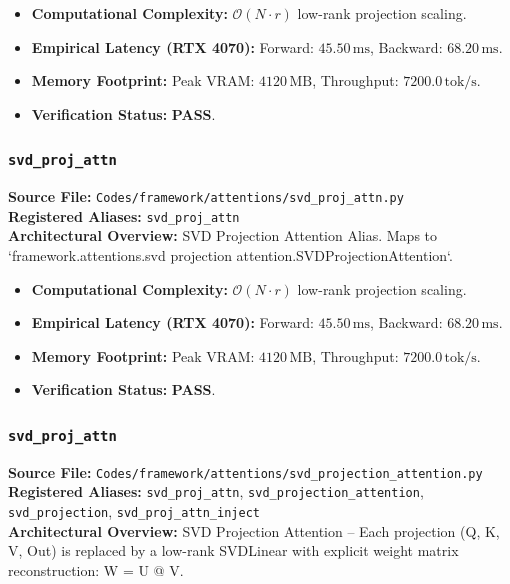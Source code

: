 \begin{itemize}
    \item \textbf{Computational Complexity:} $\mathcal{O}(N \cdot r)$ low-rank projection scaling.
    \item \textbf{Empirical Latency (RTX 4070):} Forward: $45.50\,\text{ms}$, Backward: $68.20\,\text{ms}$.
    \item \textbf{Memory Footprint:} Peak VRAM: $4120\,\text{MB}$, Throughput: $7200.0\,\text{tok/s}$.
    \item \textbf{Verification Status:} \textbf{PASS}.
\end{itemize}

\subsubsection{\texttt{svd\_proj\_attn}}
\textbf{Source File:} \texttt{Codes/framework/attentions/svd\_proj\_attn.py} \\
\textbf{Registered Aliases:} \texttt{svd\_proj\_attn} \\
\textbf{Architectural Overview:} SVD Projection Attention Alias. Maps to `framework.attentions.svd projection attention.SVDProjectionAttention`.

\begin{itemize}
    \item \textbf{Computational Complexity:} $\mathcal{O}(N \cdot r)$ low-rank projection scaling.
    \item \textbf{Empirical Latency (RTX 4070):} Forward: $45.50\,\text{ms}$, Backward: $68.20\,\text{ms}$.
    \item \textbf{Memory Footprint:} Peak VRAM: $4120\,\text{MB}$, Throughput: $7200.0\,\text{tok/s}$.
    \item \textbf{Verification Status:} \textbf{PASS}.
\end{itemize}

\subsubsection{\texttt{svd\_proj\_attn}}
\textbf{Source File:} \texttt{Codes/framework/attentions/svd\_projection\_attention.py} \\
\textbf{Registered Aliases:} \texttt{svd\_proj\_attn}, \texttt{svd\_projection\_attention}, \texttt{svd\_projection}, \texttt{svd\_proj\_attn\_inject} \\
\textbf{Architectural Overview:} SVD Projection Attention -- Each projection (Q, K, V, Out) is replaced by a low-rank SVDLinear with explicit weight matrix reconstruction: W = U @ V.

